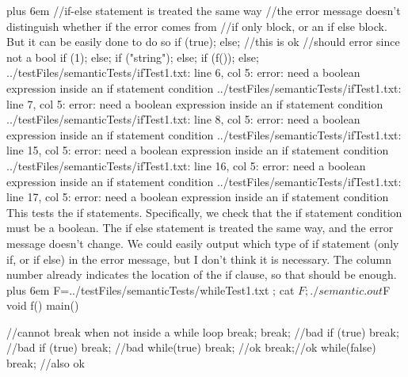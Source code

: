 \documentclass{article}
\makeatletter
\newenvironment{myverb}
 {\def\@xobeysp{\ }\verbatim\rightskip=0pt plus 6em\relax}
 {\endverbatim}
\makeatother
\begin{document}
\begin{itemize}
\begin{myverb}
{    //if-else statement is treated the same way
    //the error message doesn't distinguish whether if the error comes from
    //if only block, or an if else block. But it can be easily done to do so
    if (true); else; //this is ok
    //should error since not a bool
    if (1); else;
    if ("string"); else;
    if (f()); else;
}
../testFiles/semanticTests/ifTest1.txt: line 6, col 5: error: need a boolean expression inside an if statement condition
../testFiles/semanticTests/ifTest1.txt: line 7, col 5: error: need a boolean expression inside an if statement condition
../testFiles/semanticTests/ifTest1.txt: line 8, col 5: error: need a boolean expression inside an if statement condition
../testFiles/semanticTests/ifTest1.txt: line 15, col 5: error: need a boolean expression inside an if statement condition
../testFiles/semanticTests/ifTest1.txt: line 16, col 5: error: need a boolean expression inside an if statement condition
../testFiles/semanticTests/ifTest1.txt: line 17, col 5: error: need a boolean expression inside an if statement condition
\end{myverb}
This tests the if statements. Specifically, we check that the if statement condition must be a boolean. The if else statement is treated the same way, and the error message doesn't change. We could easily output which type of if statement (only if, or if else) in the error message, but I don't think it is necessary. The column number already indicates the location of the if clause, so that should be enough.
\begin{myverb}
F=../testFiles/semanticTests/whileTest1.txt ; cat $F; ./semantic.out $F
void f(){}
main(){
    //cannot break when not inside a while loop
    break;
    {
        { break;} //bad
    }
    if (true) break; //bad
    if (true) {break;} //bad
    while(true){
        break; //ok
        {
            break;//ok
        }
        while(false) break; //also ok
    }

}
\end{myverb}
\end{itemize}
\end{document}
